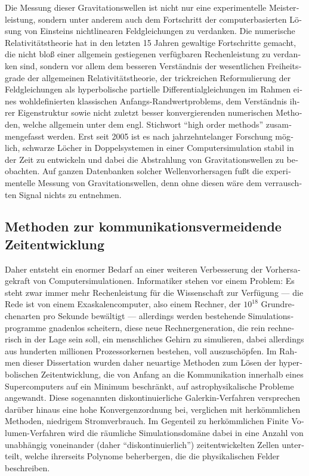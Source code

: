 \begin{otherlanguage}{german}
\begin{fullwidth}
\begin{center}
\begin{adjustwidth}{1cm}{1cm}
Die Messung dieser Gravitationswellen ist nicht nur eine %
experimentelle Meisterleistung, sondern unter anderem auch dem Fortschritt der
computerbasierten Lösung von Einsteins nichtlinearen Feldgleichungen zu
verdanken. Die numerische Relativitätstheorie hat in den letzten 15 Jahren
gewaltige Fortschritte gemacht, die nicht bloß einer allgemein
gestiegenen verfügbaren Rechenleistung zu verdanken sind, sondern vor allem
dem besseren Verständnis der wesentlichen Freiheitsgrade der allgemeinen
Relativitätstheorie, der trickreichen Reformulierung der Feldgleichungen als
hyperbolische partielle Differentialgleichungen im Rahmen eines wohldefinierten
klassischen Anfangs-Randwertproblems, dem Verständnis ihrer 
Eigenstruktur sowie nicht zuletzt besser konvergierenden numerischen Methoden,
welche allgemein unter dem engl. Stichwort ``high order methods'' zusammengefasst
werden.
Erst seit 2005 ist es nach jahrzehntelanger Forschung möglich, schwarze Löcher
in Doppelsystemen in einer Computersimulation stabil in der Zeit zu entwickeln
und dabei die Abstrahlung von Gravitationswellen zu beobachten. Auf ganzen
Datenbanken solcher Wellenvorhersagen fußt die experimentelle Messung von
Gravitationswellen, denn ohne diesen wäre dem verrauschten Signal nichts
zu entnehmen.

\subsection*{Methoden zur kommunikationsvermeidende Zeitentwicklung}
Daher entsteht ein enormer Bedarf an einer weiteren Verbesserung der
Vorhersagekraft von Computersimulationen. Informatiker stehen vor
einem Problem: Es steht zwar immer mehr Rechenleistung für die Wissenschaft zur
Verfügung --- die Rede ist von einem Exaskalencomputer, also einem Rechner, der
$10^{18}$ Grundrechenarten pro Sekunde bewältigt --- allerdings werden
bestehende Simulationsprogramme gnadenlos scheitern, diese neue
Rechnergeneration, die rein rechnerisch in der Lage sein soll, ein menschliches
Gehirn zu simulieren, dabei allerdings aus hunderten millionen Prozessorkernen
bestehen, voll auszuschöpfen. Im Rahmen dieser Dissertation wurden
daher neuartige Methoden zum Lösen der hyperbolischen Zeitentwicklung, die
von Anfang an die Kommunikation innerhalb eines Supercomputers auf ein
Minimum beschränkt, auf astrophysikalische Probleme angewandt.
Diese sogenannten diskontinuierliche Galerkin-Verfahren versprechen darüber
hinaus eine hohe Konvergenzordnung bei, verglichen mit herkömmlichen
Methoden, niedrigem Stromverbrauch. Im Gegenteil zu herkömmlichen Finite
Volumen-Verfahren wird die räumliche Simulationsdomäne dabei in eine Anzahl
von unabhängig voneinander (daher ``diskontinuierlich'') zeitentwickelten
Zellen unterteilt, welche ihrerseits Polynome beherbergen, die die
physikalischen Felder beschreiben.


\end{adjustwidth}
\end{center}
\end{fullwidth}
\end{otherlanguage}
